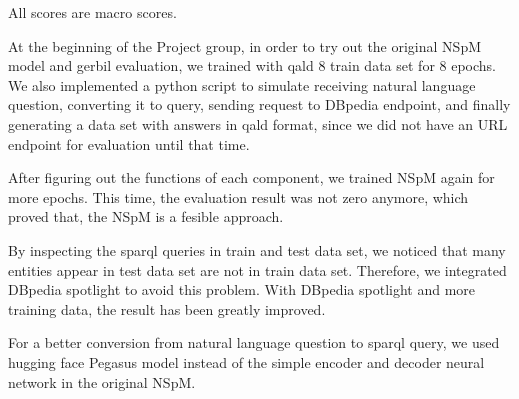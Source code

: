 All scores are macro scores. 

At the beginning of the Project group,
in order to try out the original NSpM model and gerbil evaluation,
we trained with qald 8 train data set for 8 epochs. 
We also implemented a python script to simulate 
receiving natural language question, 
converting it to query,
sending request to DBpedia endpoint, 
and finally generating a data set with answers in qald format,
since we did not have an URL endpoint for evaluation until that time. 

After figuring out the functions of each component, 
we trained NSpM again for more epochs. 
This time, the evaluation result was not zero anymore, 
which proved that,
the NSpM is a fesible approach. 

By inspecting the sparql queries in train and test data set, 
we noticed that
many entities appear in test data set are not in train data set. 
Therefore, we integrated DBpedia spotlight to avoid this problem. 
With DBpedia spotlight and more training data, 
the result has been greatly improved. 

For a better conversion from natural language question to sparql query, 
we used hugging face Pegasus model instead of the simple encoder and decoder neural network in the original NSpM.

